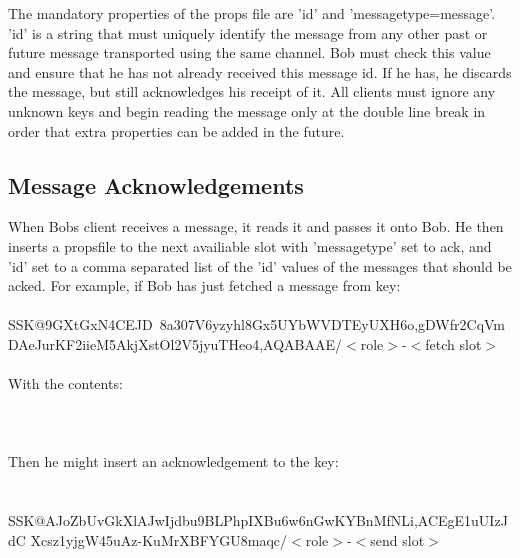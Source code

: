 \documentclass[12pt,a4paper]{article}
\begin{document}
The mandatory properties of the props file are 'id' and 'messagetype=message'. 'id' is a string that must
uniquely identify the message from any other past or future message transported using the same
channel. Bob must check this value and ensure that he has not already received this message id. If
he has, he discards the message, but still acknowledges his receipt of it. All clients must ignore
any unknown keys and begin reading the message only at the double line break in order that extra
properties can be added in the future.

\subsection{Message Acknowledgements}
When Bobs client receives a message, it reads it and passes it onto Bob. He then
inserts a propsfile to the next availiable slot with 'messagetype' set to ack, and 'id'
set to a comma separated list of the 'id' values of the messages that should be acked.
For example, if Bob has just fetched a message from key: \\
\\
SSK@9GXtGxN4CEJD~8a\-307V6yzyhl8Gx5U\-YbWVDTEyUXH6o,gDWfr2CqVm\-
DAeJurKF2iieM\-5AkjXstOl2V5j\-yuTHeo4,AQABAAE/$<$role$>$-$<$fetch slot$>$ \\
\\
With the contents: \\
\\

 \\
\\
Then he might insert an acknowledgement to the key: \\
\\
\\
SSK@AJoZbUvGkXlAJwI\-jdbu9BLPhpIXBu6\-w6nGwKYBnMfNLi,ACEgE1uUIzJdC\-
Xcsz1yjgW45u\-Az-KuMrXBFYG\-U8maqc/$<$role$>$-$<$send slot$>$ \\
\end{document}
